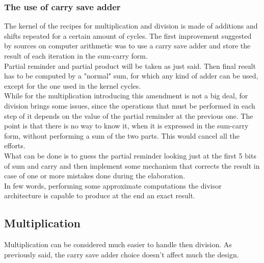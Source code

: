\subsubsection{The use of carry save adder}
The kernel of the recipes for multiplication and division is made of additions and shifts repeated for a certain amount of cycles. The first improvement suggested by sources on computer arithmetic was to use a carry save adder and store the result of each iteration in the sum-carry form.\\
Partial reminder and partial product will be taken as just said. Then final result has to be computed by a "normal" sum, for which any kind of adder can be used, except for the one used in the kernel cycles.\\
While for the multiplication introducing this amendment is not a big deal, for division brings some issues, since the operations that must be performed in each step of it depends on the value of the partial reminder at the previous one. The point is that there is no way to know it, when it is expressed in the sum-carry form, without performing a sum of the two parts. This would cancel all the efforts.\\ 
What can be done is to guess the partial reminder looking just at the first 5 bits of sum and carry and then implement some mechanism that corrects the result in case of one or more mistakes done during the elaboration.\\ In few words, performing some approximate computations the divisor architecture is capable to produce at the end an exact result.
\subsection{Multiplication}
Multiplication can be considered much easier to handle then division. As previously said, the carry save adder choice doesn't affect much the design.\\
